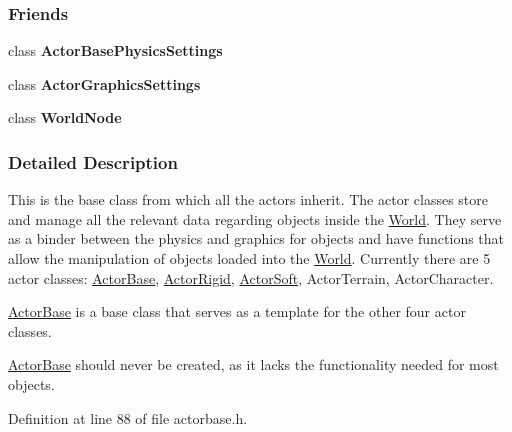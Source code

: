 \subsubsection*{Friends}
\begin{DoxyCompactItemize}
\item 
\hypertarget{classMezzanine_1_1ActorBase_ad56afa2bffce8b552583041f21297874}{
class {\bfseries ActorBasePhysicsSettings}}
\label{classMezzanine_1_1ActorBase_ad56afa2bffce8b552583041f21297874}

\item 
\hypertarget{classMezzanine_1_1ActorBase_a01f5bcaf4807085e756d9c03b3eb8d9d}{
class {\bfseries ActorGraphicsSettings}}
\label{classMezzanine_1_1ActorBase_a01f5bcaf4807085e756d9c03b3eb8d9d}

\item 
\hypertarget{classMezzanine_1_1ActorBase_a1cacd07efb11226da49a7c80569b18e8}{
class {\bfseries WorldNode}}
\label{classMezzanine_1_1ActorBase_a1cacd07efb11226da49a7c80569b18e8}

\end{DoxyCompactItemize}


\subsubsection{Detailed Description}
This is the base class from which all the actors inherit. The actor classes store and manage all the relevant data regarding objects inside the \hyperlink{classMezzanine_1_1World}{World}. They serve as a binder between the physics and graphics for objects and have functions that allow the manipulation of objects loaded into the \hyperlink{classMezzanine_1_1World}{World}. Currently there are 5 actor classes: \hyperlink{classMezzanine_1_1ActorBase}{ActorBase}, \hyperlink{classMezzanine_1_1ActorRigid}{ActorRigid}, \hyperlink{classMezzanine_1_1ActorSoft}{ActorSoft}, ActorTerrain, ActorCharacter. \par
 \hyperlink{classMezzanine_1_1ActorBase}{ActorBase} is a base class that serves as a template for the other four actor classes. \par
 \hyperlink{classMezzanine_1_1ActorBase}{ActorBase} should never be created, as it lacks the functionality needed for most objects. 

Definition at line 88 of file actorbase.h.




